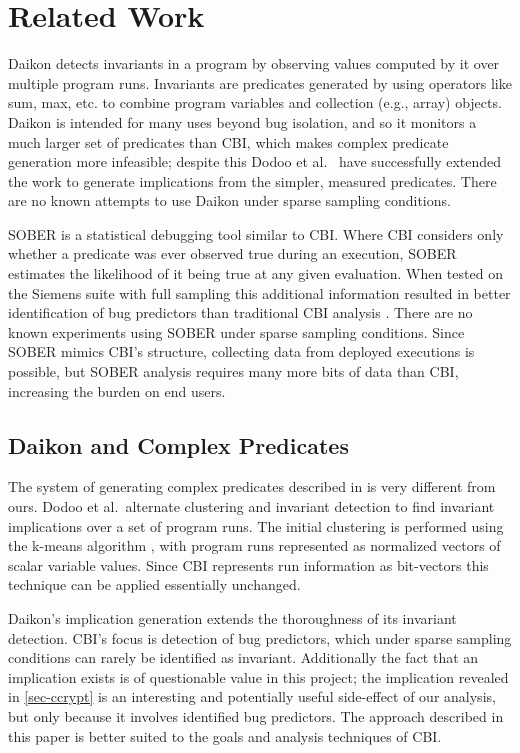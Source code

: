
\section{Related Work}
\label{sec-related-work}
Daikon \cite{ErnstPGMPTX2006} detects invariants in a program by observing values computed by it over multiple program runs.  Invariants are predicates generated by using operators like sum, max, etc. to combine program variables and collection (e.g., array) objects.  Daikon is intended for many uses beyond bug isolation, and so it monitors a much larger set of predicates than CBI, which makes complex predicate generation more infeasible; despite this Dodoo et al.\ \cite{ErnstDRAFT} have successfully extended the work to generate implications from the simpler, measured predicates.  There are no known attempts to use Daikon under sparse sampling conditions.

SOBER \cite{1081753} is a statistical debugging tool similar to CBI.  Where CBI considers only whether a predicate was ever observed true during an execution, SOBER estimates the likelihood of it being true at any given evaluation.  When tested on the Siemens suite with full sampling this additional information resulted in better identification of bug predictors than traditional CBI analysis \cite{1081753}.  There are no known experiments using SOBER under sparse sampling conditions.  Since SOBER mimics CBI's structure, collecting data from deployed executions is possible, but SOBER analysis requires many more bits of data than CBI, increasing the burden on end users.

\subsection{Daikon and Complex Predicates}
\label{sec-daikon}
The system of generating complex predicates described in \cite{ErnstDRAFT} is very different from ours.  Dodoo et al.\ alternate clustering and invariant detection to find invariant implications over a set of program runs.  The initial clustering is performed using the k-means algorithm \cite{jain99data}, with program runs represented as normalized vectors of scalar variable values.  Since CBI represents run information as bit-vectors this technique can be applied essentially unchanged.

Daikon's implication generation extends the thoroughness of its invariant detection.  CBI's focus is detection of bug predictors, which under sparse sampling conditions can rarely be identified as invariant.  Additionally the fact that an implication exists is of questionable value in this project; the implication revealed in \autoref{sec-ccrypt} is an interesting and potentially useful side-effect of our analysis, but only because it involves identified bug predictors.  The approach described in this paper is better suited to the goals and analysis techniques of CBI.

